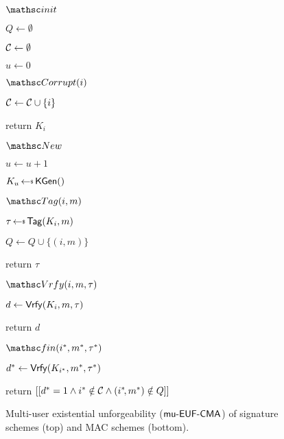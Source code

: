 \begin{figure}[t]
	\vspace*{0.1cm}
	
	\hrulefill
	
	\begin{minipage}[t]{0.2\textwidth}
		\NewExperiment[$\Gm^{\muEUFCMA}_{\MACScheme,\advA}$]
		
		\begin{oracle}{$\Initialize$}
			\item $Q \gets \emptyset$
			\item $\mathcal{C} \gets \emptyset$
			\item $u \gets 0$
		\end{oracle}
		
		\ExptSepSpace
		
			\begin{oracle}{$\Corrupt(i)$}
			\item $\mathcal{C} \gets \mathcal{C} \cup \{i\}$
			\item return $K_i$
		\end{oracle}
		\ExptSepSpace
	
			\end{minipage}
	\begin{minipage}[t]{0.3\textwidth}
		\vspace*{\iffull0.4cm\else0cm\fi}
		\begin{oracle}{$\New$}
			\item $u \gets u + 1$
			\item $K_u \getsr \MACKGen()$
			\item[]
		\end{oracle}
		\ExptSepSpace
		\begin{oracle}{$\OTag(i, m)$}
			\item $\tau \getsr \MACTag(K_i, m)$
			\item $Q \gets Q \cup \{(i, m)\}$
			\item return $\tau$
		\end{oracle}
		
		
		\ExptSepSpace
			\end{minipage}
	\begin{minipage}[t]{0.47\textwidth}
		\vspace*{.4cm}
		
		\begin{oracle}{$\OVerify(i, m, \tau)$}
			\item $d \gets \mathsf{Vrfy}(K_i, m, \tau)$
			\item return $d$
			\item[]
		\end{oracle}
		\ExptSepSpace
		
		\begin{oracle}{$\Finalize(i^*, m^*, \tau^*)$}
			\item $d^* \gets \mathsf{Vrfy}(K_{i^*}, m^*, \tau^*)$
			\item return $[[ d^* = 1 \land i^* \notin \mathcal{C} \land (i^*\!, m^*) \notin Q ]]$
		\end{oracle}
	\end{minipage}
	
	\caption{%
		Multi-user existential unforgeability ($\mathsf{mu{\text{\normalfont-}}EUF{\text{\normalfont-}}CMA}$) of signature schemes (top) and MAC schemes (bottom).
	}
	\label{fig:muEUFCMA}
\end{figure}
